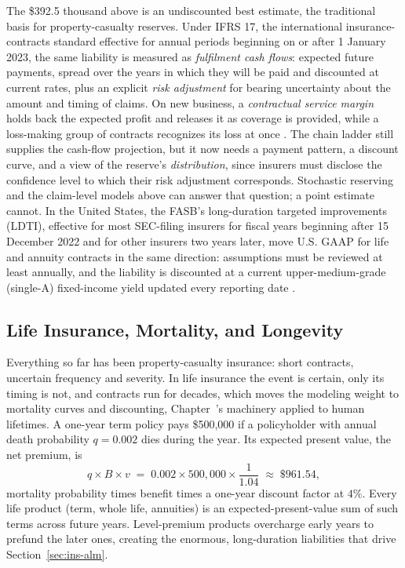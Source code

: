 \documentclass[../ai_in_finance]{subfiles}
\begin{document}
The \$392.5 thousand above is an undiscounted best estimate, the traditional basis for property-casualty reserves. Under IFRS 17, the international insurance-contracts standard effective for annual periods beginning on or after 1 January 2023, the same liability is measured as \emph{fulfilment cash flows}: expected future payments, spread over the years in which they will be paid and discounted at current rates, plus an explicit \emph{risk adjustment} for bearing uncertainty about the amount and timing of claims. On new business, a \emph{contractual service margin} holds back the expected profit and releases it as coverage is provided, while a loss-making group of contracts recognizes its loss at once \parencite{iasb2017ifrs17}. The chain ladder still supplies the cash-flow projection, but it now needs a payment pattern, a discount curve, and a view of the reserve's \emph{distribution}, since insurers must disclose the confidence level to which their risk adjustment corresponds. Stochastic reserving and the claim-level models above can answer that question; a point estimate cannot. In the United States, the FASB's long-duration targeted improvements (LDTI), effective for most SEC-filing insurers for fiscal years beginning after 15 December 2022 and for other insurers two years later, move U.S. GAAP for life and annuity contracts in the same direction: assumptions must be reviewed at least annually, and the liability is discounted at a current upper-medium-grade (single-A) fixed-income yield updated every reporting date \parencite{fasb2018ldti}.

\subsection{Life Insurance, Mortality, and Longevity}
\label{sec:ins-life}

Everything so far has been property-casualty insurance: short contracts, uncertain frequency and severity. In life insurance the event is certain, only its timing is not, and contracts run for decades, which moves the modeling weight to mortality curves and discounting, Chapter~'s machinery applied to human lifetimes. A one-year term policy pays \$500{,}000 if a policyholder with annual death probability $q = 0.002$ dies during the year. Its expected present value, the net premium, is
\begin{equation*}
q \times B \times v \;=\; 0.002 \times 500{,}000 \times \frac{1}{1.04} \;\approx\; \$961.54,
\end{equation*}
mortality probability times benefit times a one-year discount factor at $4\%$. Every life product (term, whole life, annuities) is an expected-present-value sum of such terms across future years. Level-premium products overcharge early years to prefund the later ones, creating the enormous, long-duration liabilities that drive Section~\ref{sec:ins-alm}.
\end{document}
